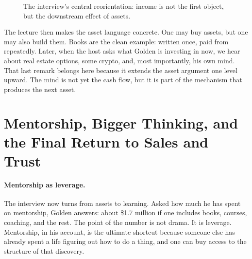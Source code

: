 \begin{figure}[h]
\centering
{}
\caption{The interview's central reorientation: income is not the first object, but the downstream effect of assets.}
\end{figure}

The lecture then makes the asset language concrete. One may buy assets, but one may also build them. Books are the clean example: written once, paid from repeatedly. Later, when the host asks what Golden is investing in now, we hear about real estate options, some crypto, and, most importantly, his own mind. That last remark belongs here because it extends the asset argument one level upward. The mind is not yet the cash flow, but it is part of the mechanism that produces the next asset.

\section{Mentorship, Bigger Thinking, and the Final Return to Sales and Trust}

\paragraph{Mentorship as leverage.}
The interview now turns from assets to learning. Asked how much he has spent on mentorship, Golden answers: about \$1.7 million if one includes books, courses, coaching, and the rest. The point of the number is not drama. It is leverage. Mentorship, in his account, is the ultimate shortcut because someone else has already spent a life figuring out how to do a thing, and one can buy access to the structure of that discovery.

